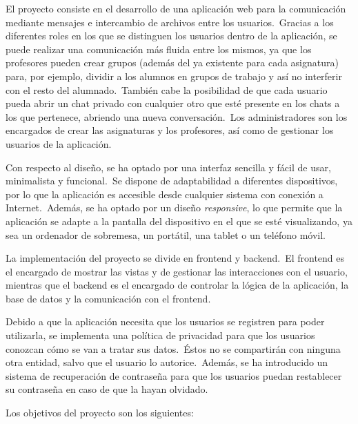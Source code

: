 

El proyecto consiste en el desarrollo de una aplicación web para la comunicación mediante mensajes e intercambio de
archivos entre los usuarios.\ Gracias a los diferentes roles en los que se distinguen los usuarios dentro de la
aplicación, se puede
realizar una comunicación más fluida entre los mismos, ya que los profesores pueden crear grupos (además del ya
existente para cada asignatura) para, por ejemplo, dividir a los alumnos en grupos de trabajo y así no interferir con
el resto del alumnado.\ También cabe la posibilidad de que cada usuario pueda abrir un chat privado con cualquier
otro que esté presente en los chats a los que pertenece, abriendo una nueva conversación.\ Los administradores son
los encargados de crear las asignaturas y los profesores, así como de gestionar los usuarios de la aplicación.

Con respecto al diseño, se ha optado por una interfaz sencilla y fácil de usar, minimalista y funcional.\ Se dispone
de adaptabilidad a diferentes dispositivos, por lo que la aplicación es accesible desde cualquier sistema con
conexión a Internet.\ Además, se ha optado por un diseño \textit{responsive}, lo que permite que la aplicación se
adapte a la
pantalla del dispositivo en el que se esté visualizando, ya sea un ordenador de sobremesa, un portátil, una tablet o un
teléfono móvil.

La implementación del proyecto se divide en frontend y backend.\ El frontend es el encargado de mostrar las vistas
y de gestionar las interacciones con el usuario, mientras que el backend es el encargado de controlar la lógica de
la aplicación, la base de datos y la comunicación con el frontend.

Debido a que la aplicación necesita que los usuarios se registren para poder utilizarla, se implementa una política de
privacidad para que los usuarios conozcan cómo se van a tratar sus datos.\ Éstos no se compartirán con
ninguna otra entidad, salvo que el usuario lo autorice.\ Además, se ha introducido un sistema de
recuperación de contraseña para que los usuarios puedan restablecer su contraseña en caso de que la hayan olvidado.


Los objetivos del proyecto son los siguientes:

